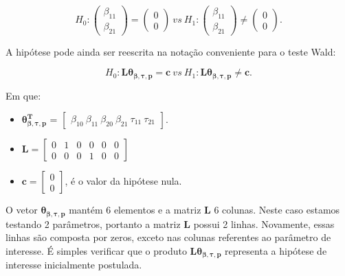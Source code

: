 $$
H_0: 
\begin{pmatrix}
\beta_{11} \\ 
\beta_{21}
\end{pmatrix} 
= 
\begin{pmatrix}
0 \\ 
0
\end{pmatrix}
\ vs \ 
H_1: 
\begin{pmatrix}
\beta_{11} \\ 
\beta_{21}
\end{pmatrix} 
\neq
\begin{pmatrix}
0 \\ 
0 
\end{pmatrix}.
$$

A hipótese pode ainda ser reescrita na notação conveniente para o teste Wald:

\begin{equation}
H_0: \boldsymbol{L}\boldsymbol{\theta_{\beta,\tau,p}} = \boldsymbol{c} \ vs \ H_1: \boldsymbol{L}\boldsymbol{\theta_{\beta,\tau,p}} \neq \boldsymbol{c}.
\end{equation}

Em que:

\begin{itemize}
  
  \item $\boldsymbol{\theta_{\beta,\tau,p}^T}$ = $\begin{bmatrix} \beta_{10} \  \beta_{11} \ \beta_{20} \ \beta_{21} \ \tau_{11} \ \tau_{21} \end{bmatrix}$.


\item $\boldsymbol{L} = \begin{bmatrix} 0 & 1 & 0 & 0 & 0 & 0 \\
0 & 0 & 0 & 1 & 0 & 0 \end{bmatrix}$
 
\item $\boldsymbol{c} = \begin{bmatrix} 0 \\ 0 \end{bmatrix}$, é o valor da hipótese nula. 

\end{itemize}

O vetor $\boldsymbol{\theta_{\beta,\tau,p}}$ mantém 6 elementos e a matriz $\boldsymbol{L}$ 6 colunas. Neste caso estamos testando 2 parâmetros, portanto a matriz $\boldsymbol{L}$ possui 2 linhas. Novamente, essas linhas são composta por zeros, exceto nas colunas referentes ao parâmetro de interesse. É simples verificar que o produto $\boldsymbol{L}\boldsymbol{\theta_{\beta,\tau,p}}$ representa a hipótese de interesse inicialmente postulada.

